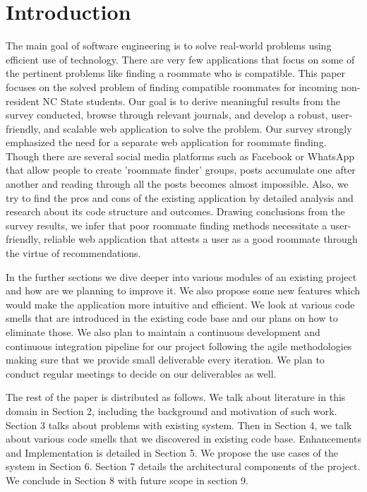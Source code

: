 \documentclass{sig-alternate-05-2015}
\begin{document}

\section{Introduction}

The main goal of software engineering is to solve real-world problems using efficient use of technology. There are very few applications that focus on some of the pertinent problems like finding a roommate who is compatible. This paper focuses on the solved problem of finding compatible roommates for incoming non-resident NC State students. Our goal is to derive meaningful results from the survey conducted, browse through relevant journals, and develop a robust, user-friendly, and scalable web application to solve the problem. Our survey strongly emphasized the need for a separate web application for roommate finding. Though there are several social media platforms such as Facebook or WhatsApp that allow people to create 'roommate finder' groups, posts accumulate one after another and reading through all the posts becomes almost impossible. Also, we try to find the pros and cons of the existing application by detailed analysis and research about its code structure and outcomes. Drawing conclusions from the survey results, we infer that poor roommate finding methods necessitate a user-friendly, reliable web application that attests a user as a good roommate through the virtue of recommendations.

In the further sections we dive deeper into various modules of an existing project and how are we planning to improve it. We also propose some new features which would make the application more intuitive and efficient. We look at various code smells that are introduced in the existing code base and our plans on how to eliminate those. We also plan to maintain a continuous development and continuous integration pipeline for our project following the agile methodologies making sure that we provide small deliverable every iteration. We plan to conduct regular meetings to decide on our deliverables as well.

The rest of the paper is distributed as follows. We talk about literature in this domain in Section 2, including the background and motivation of such work. Section 3 talks about problems with existing system. Then in Section 4, we talk about various code smells that we discovered in existing code base. Enhancements and Implementation is detailed in Section 5. We propose the use cases of the system in Section 6. Section 7 details the architectural components of the project. We conclude in Section 8 with future scope in section 9. 
\end{document}
